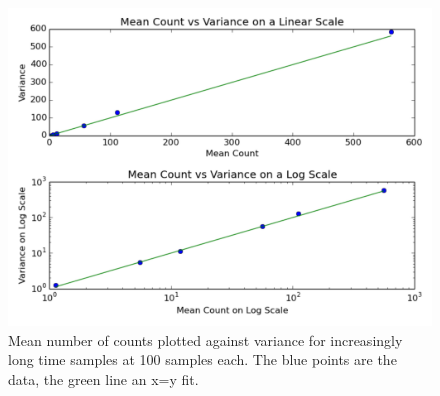 \documentclass[a4paper,12pt]{article}
\begin{document}
\begin{figure}[ht]
\centering
\includegraphics[width=\linewidth]{section7.pdf}
\caption{Mean number of counts plotted against variance for increasingly long time samples at 100 samples each. The blue points are the data, the green line an x=y fit.}
\label{fig:section7}
\end{figure}
\end{document}
